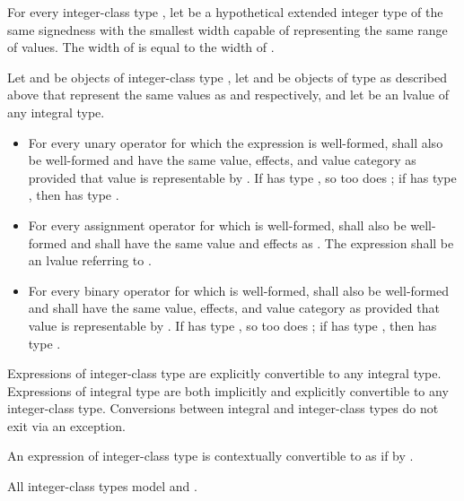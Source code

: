 \pnum
For every integer-class type ,
let  be a hypothetical extended integer type
of the same signedness with the smallest width
capable of representing the same range of values.
The width of  is equal to the width of .

\pnum
Let  and  be objects of integer-class type ,
let  and  be objects of type  as described above
that represent the same values as  and  respectively, and
let  be an lvalue of any integral type.
\begin{itemize}
\item
  For every unary operator  for which the expression 
  is well-formed,  shall also be well-formed
  and have the same value, effects, and value category as 
  provided that value is representable by .
  If  has type , so too does ;
  if  has type , then  has type .
\item
  For every assignment operator 
  for which  is well-formed,
   shall also be well-formed and
  shall have the same value and effects as .
  The expression  shall be an lvalue referring to .
\item
  For every binary operator  for which  is well-formed,
   shall also be well-formed and
  shall have the same value, effects, and value category as 
  provided that value is representable by .
  If  has type , so too does ;
  if  has type , then  has type .
\end{itemize}

\pnum
Expressions of integer-class type are
explicitly convertible to any integral type.
Expressions of integral type are
both implicitly and explicitly convertible to any integer-class type.
Conversions between integral and integer-class types
do not exit via an exception.

\pnum
An expression  of integer-class type  is
contextually convertible to 
as if by .

\pnum
All integer-class types model
 and
.


